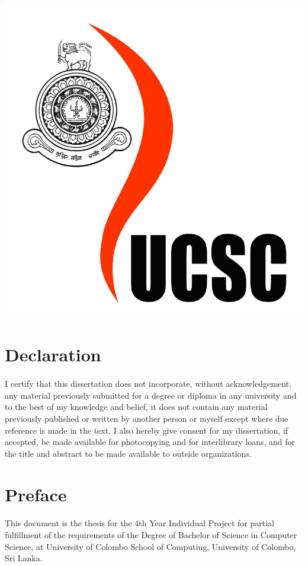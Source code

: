 \documentclass[12pt]{article}
\numberwithin{figure}{section}
\numberwithin{table}{section}
\begin{document}
\begin{titlepage}
\includegraphics[scale=0.06]{ucsc}
\vfill %
\end{titlepage}
\section*{Declaration}
\paragraph{}
I certify that this dissertation does not incorporate, without acknowledgement, any material previously submitted for a degree or diploma in any university and to the best of my knowledge and belief, it does not contain any material previously published or written by another person or myself except where due reference is made in the text. I also hereby give consent for my dissertation, if accepted, be made available for photocopying and for interlibrary loans, and for the title and abstract to be made available to outside organizations.
\newpage
\section*{Preface}
\paragraph{}
This  document is the thesis for  the 4th Year Individual Project  for  partial  fulfillment  of  the requirements of the Degree of Bachelor of Science in Computer Science, at University of Colombo School of Computing, University of Colombo, Sri Lanka.
\end{document}
